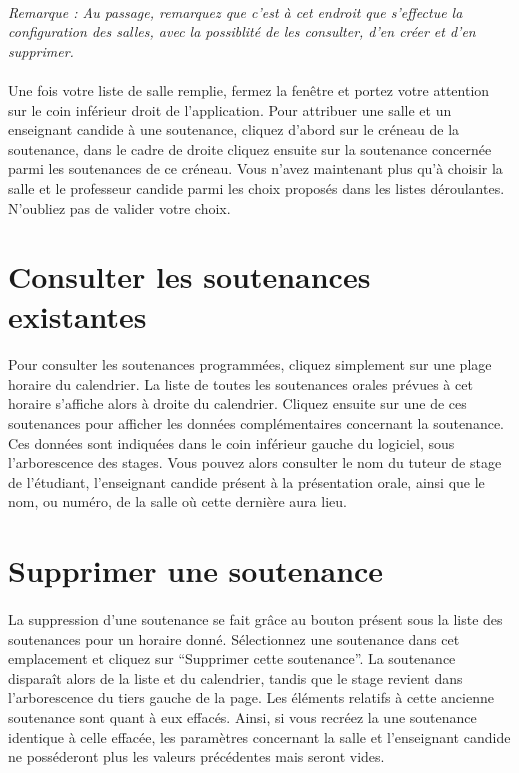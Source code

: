 \documentclass[a4paper,10pt]{book}
\begin{document}
	\paragraph{}  
	  \textit{Remarque : Au passage, remarquez que c'est à cet endroit que s'effectue la configuration des salles, avec la possiblité de les consulter, d'en créer et d'en supprimer.}
	  
	\paragraph{}
	  Une fois votre liste de salle remplie, fermez la fenêtre et portez votre attention sur le coin inférieur droit de l'application.
	  Pour attribuer une salle et un enseignant candide à une soutenance, cliquez d'abord sur le créneau de la soutenance, dans le cadre de droite cliquez ensuite sur la soutenance concernée parmi les soutenances de ce créneau.
	  Vous n'avez maintenant plus qu'à choisir la salle et le professeur candide parmi les choix proposés dans les listes déroulantes.
	  N'oubliez pas de valider votre choix.
	  
	
	
    \section{Consulter les soutenances existantes}
      \paragraph{}
	Pour consulter les soutenances programmées, cliquez simplement sur une plage horaire du calendrier.
	La liste de toutes les soutenances orales prévues à cet horaire s'affiche alors à droite du calendrier.
	Cliquez ensuite sur une de ces soutenances pour afficher les données complémentaires concernant la soutenance.
	Ces données sont indiquées dans le coin inférieur gauche du logiciel, sous l'arborescence des stages.
	Vous pouvez alors consulter le nom du tuteur de stage de l'étudiant, l'enseignant candide présent à la présentation orale, ainsi que le nom, ou numéro, de la salle où cette dernière aura lieu.
      
      
    \section{Supprimer une soutenance}
      \paragraph{}
	La suppression d'une soutenance se fait grâce au bouton présent sous la liste des soutenances pour un horaire donné.
	Sélectionnez une soutenance dans cet emplacement et cliquez sur ``Supprimer cette soutenance''.
	La soutenance disparaît alors de la liste et du calendrier, tandis que le stage revient dans l'arborescence du tiers gauche de la page.
	Les éléments relatifs à cette ancienne soutenance sont quant à eux effacés.
	Ainsi, si vous recréez la une soutenance identique à celle effacée, les paramètres concernant la salle et l'enseignant candide ne posséderont plus les valeurs précédentes mais seront vides.
	
\end{document}
